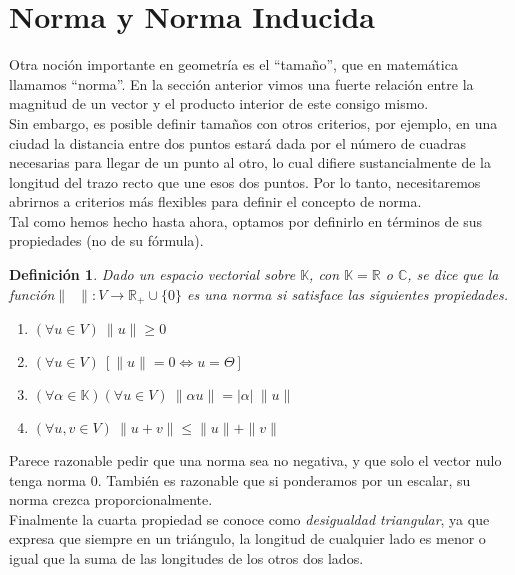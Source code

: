 \documentclass[12pt]{book}
\newtheorem{defi}{Definici\'on}
\def\R{\mathbb{R}}
\def\C{\mathbb{C}}
\def\K{\mathbb{K}}
\begin{document}
{\vspace{0.6 cm}

\section{Norma y Norma Inducida}

Otra noción importante en geometría es el ``tamaño'', que en matemática llamamos ``norma''.
En la sección anterior vimos una fuerte relación entre la magnitud de un vector y el producto interior de este consigo mismo.\\

Sin embargo, es posible definir tamaños con otros criterios, por ejemplo, en una ciudad la distancia entre dos puntos estará dada por el número de cuadras necesarias para llegar de un punto al otro, lo cual difiere sustancialmente de la longitud del trazo recto que une esos dos puntos. Por lo tanto, necesitaremos abrirnos a criterios más flexibles para definir el concepto de norma.\\

Tal como hemos hecho hasta ahora, optamos por definirlo en términos de sus propiedades (no de su fórmula).\\

\vspace{0.3 cm}

 \begin{defi}
Dado un espacio vectorial sobre $\K$, con $\K=\R$ o $\C$, se dice que la función\break $\|\phantom{x}\|:V\rightarrow \R_+\cup\{0\}$ es una \emph{norma} si satisface las siguientes propiedades.
\begin{enumerate}
\item $(\forall u\in V)\ \|u\| \ge 0$
\item $(\forall u\in V)\ [\|u\|=0\Leftrightarrow u=\Theta]$
\item $(\forall \alpha \in \K)(\forall u\in V)\ \|\alpha u\|=|\alpha | \ \|u\|$
\item $(\forall u,v\in V)\ \|u+v\|\le \|u\| + \|v\|$
\end{enumerate}
\end{defi}

Parece razonable pedir que una norma sea no negativa, y que solo el vector nulo tenga norma 0.
También es razonable que si ponderamos por un escalar, su norma crezca proporcionalmente.\\

Finalmente la cuarta propiedad se conoce como \emph{desigualdad triangular}, ya que expresa que siempre en un triángulo, la longitud de cualquier lado es menor o igual que la suma de las longitudes de los otros dos lados.

}
\end{document}
